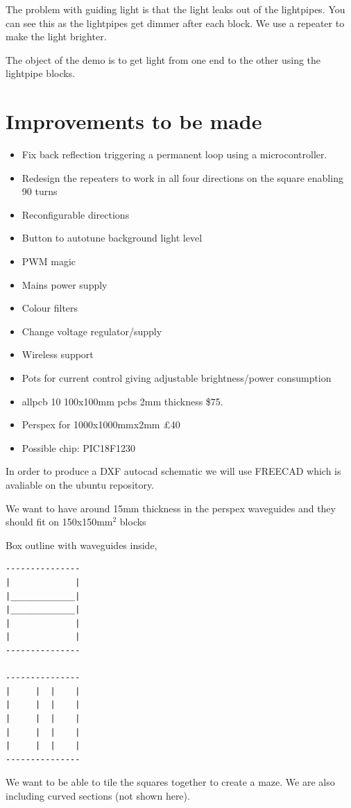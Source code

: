 \documentclass[12pt]{article}
\begin{document}
The problem with guiding light is that the light leaks out of the lightpipes. You can see this as the lightpipes get dimmer after each block. We use a repeater to make the light brighter.  

The object of the demo is to get light from one end to the other using the lightpipe blocks.


\section{Improvements to be made}

\begin{itemize}
	\item Fix back reflection triggering a permanent loop using a microcontroller.
	\item Redesign the repeaters to work in all four directions on the square enabling 90 \degree turns 
	\item Reconfigurable directions
	\item Button to autotune background light level
	\item PWM magic
	\item Mains power supply 
	\item Colour filters
	\item Change voltage regulator/supply
	\item Wireless support
	\item Pots for current control giving adjustable brightness/power consumption	
\end{itemize}

\begin{itemize}
	\item allpcb 10 100x100mm pcbs 2mm thickness \$75.
	\item Perspex for 1000x1000mmx2mm £40
        \item Possible chip: PIC18F1230
\end{itemize}

In order to produce a DXF autocad schematic we will use FREECAD which is avaliable on the ubuntu repository.

We want to have around 15mm thickness in the perspex waveguides and they should fit on 150x150mm$^2$ blocks

Box outline with waveguides inside, 
\begin{verbatim}
---------------
|             |
|_____________|
|_____________| 
|             |
|             |
---------------

---------------
|     |  |    |
|     |  |    |
|     |  |    | 
|     |  |    |
|     |  |    |
---------------

\end{verbatim}


We want to be able to tile the squares together to create a maze. We are also including curved sections (not shown here).
\end{document}
